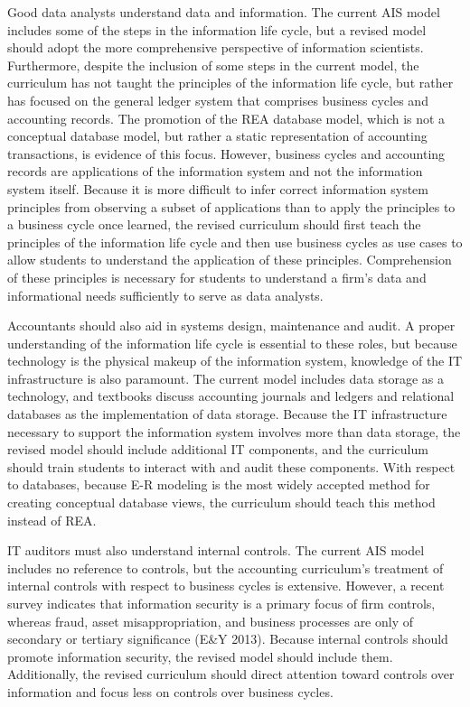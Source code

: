 \documentclass[12pt]{article}
\begin{document}
Good data analysts understand data and information. The current AIS model includes some of the steps in the information life cycle, but a revised model should adopt the more comprehensive perspective of information scientists. Furthermore, despite the inclusion of some steps in the current model, the curriculum has not taught the principles of the information life cycle, but rather has focused on the general ledger system that comprises business cycles and accounting records. The promotion of the REA database model, which is not a conceptual database model, but rather a static representation of accounting transactions, is evidence of this focus. However, business cycles and accounting records are applications of the information system and not the information system itself. Because it is more difficult to infer correct information system principles from observing a subset of applications than to apply the principles to a business cycle once learned, the revised curriculum should first teach the principles of the information life cycle and then use business cycles as use cases to allow students to understand the application of these principles. Comprehension of these principles is necessary for students to understand a firm's data and informational needs sufficiently to serve as data analysts.

Accountants should also aid in systems design, maintenance and audit. A proper understanding of the information life cycle is essential to these roles, but because technology is the physical makeup of the information system, knowledge of the IT infrastructure is also paramount. The current model includes data storage as a technology, and textbooks discuss accounting journals and ledgers and relational databases as the implementation of data storage. Because the IT infrastructure necessary to support the information system involves more than data storage, the revised model should include additional IT components, and the curriculum should train students to interact with and audit these components. With respect to databases, because E-R modeling is the most widely accepted method for creating conceptual database views, the curriculum should teach this method instead of REA.

IT auditors must also understand internal controls. The current AIS model includes no reference to controls, but the accounting curriculum's treatment of internal controls with respect to business cycles is extensive. However, a recent survey indicates that information security is a primary focus of firm controls, whereas fraud, asset misappropriation, and business processes are only of secondary or tertiary significance (E\&Y 2013). Because internal controls should promote information security, the revised model should include them. Additionally, the revised curriculum should direct attention toward controls over information and focus less on controls over business cycles.
\end{document}

